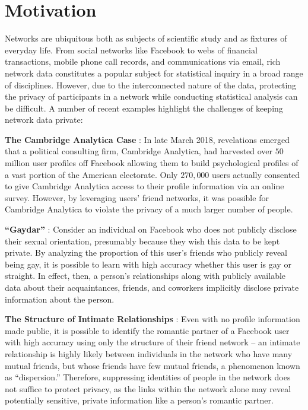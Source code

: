 \section{Motivation}

Networks are ubiquitous both as subjects of scientific study and as fixtures of everyday life. From social networks like Facebook to webs of financial transactions, mobile phone call records, and communications via email, rich network data constitutes a popular subject for statistical inquiry in a broad range of disciplines. However, due to the interconnected nature of the data, protecting the privacy of participants in a network while conducting statistical analysis can be difficult. A number of recent examples highlight the challenges of keeping network data private:

\textbf{The Cambridge Analytica Case} \cite{nytimes}:
In late March 2018, revelations emerged that a political consulting firm, Cambridge Analytica, had harvested over $50$ million user profiles off Facebook allowing them to build psychological profiles of a vast portion of the American electorate. Only $270,000$ users actually consented to give Cambridge Analytica access to their profile information via an online survey. However, by leveraging users' friend networks, it was possible for Cambridge Analytica to violate the privacy of a much larger number of people. 


\textbf{``Gaydar''} \cite{JM09}:
Consider an individual on Facebook who does not publicly disclose their sexual orientation, presumably because they wish this data to be kept private. By analyzing the proportion of this user's friends who publicly reveal being gay, it is possible to learn with high accuracy whether this user is gay or straight. In effect, then, a person's relationships along with publicly available data about their acquaintances, friends, and coworkers implicitly disclose private information about the person. 

\textbf{The Structure of Intimate Relationships} \cite{BK14}:
Even with no profile information made public, it is possible to identify the romantic partner of a Facebook user with high accuracy using only the structure of their friend network -- an intimate relationship is highly likely between individuals in the network who have many mutual friends, but whose friends have few mutual friends, a phenomenon known as ``dispersion.'' Therefore, suppressing identities of people in the network does not suffice to protect privacy, as the links within the network alone may reveal potentially sensitive, private information like a person's romantic partner.  

